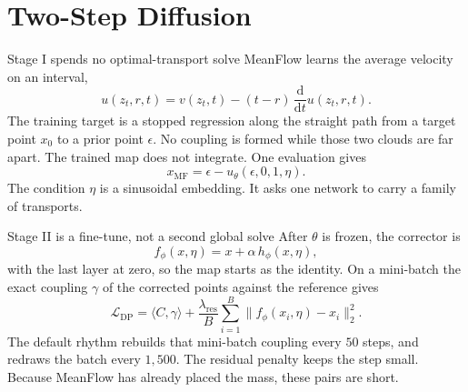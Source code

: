 \documentclass[aspectratio=169,11pt,t]{beamer}
\newcommand{\sectime}{}
\begin{document}
\renewcommand{\sectime}{About seven minutes}
\section[Two-Step]{Two-Step Diffusion}

\begin{frame}{Stage I spends no optimal-transport solve}
  MeanFlow learns the average velocity on an interval,
  \[
    u(z_t,r,t)
    =v(z_t,t)-(t-r)\,\frac{\mathrm{d}}{\mathrm{d}t}u(z_t,r,t).
  \]
  The training target is a stopped regression along the straight path from a target point $x_0$ to a prior point $\epsilon$.
  No coupling is formed while those two clouds are far apart.
  \vspace{0.35em}
  The trained map does not integrate. One evaluation gives
  \[
    x_{\mathrm{MF}}=\epsilon-u_\theta(\epsilon,0,1,\eta).
  \]
  The condition $\eta$ is a sinusoidal embedding.
  It asks one network to carry a family of transports.
\end{frame}

\begin{frame}{Stage II is a fine-tune, not a second global solve}
  After $\theta$ is frozen, the corrector is
  \[
    f_\phi(x,\eta)=x+\alpha\, h_\phi(x,\eta),
  \]
  with the last layer at zero, so the map starts as the identity.
  On a mini-batch the exact coupling $\gamma$ of the corrected points against the reference gives
  \[
    \mathcal{L}_{\mathrm{DP}}
    =\langle C,\gamma\rangle
    +\frac{\lambda_{\mathrm{res}}}{B}\sum_{i=1}^B\|f_\phi(x_i,\eta)-x_i\|_2^2.
  \]
  \vspace{0.3em}
  The default rhythm rebuilds that mini-batch coupling every $50$ steps, and redraws the batch every $1{,}500$.
  The residual penalty keeps the step small.
  Because MeanFlow has already placed the mass, these pairs are short.
\end{frame}
\end{document}
